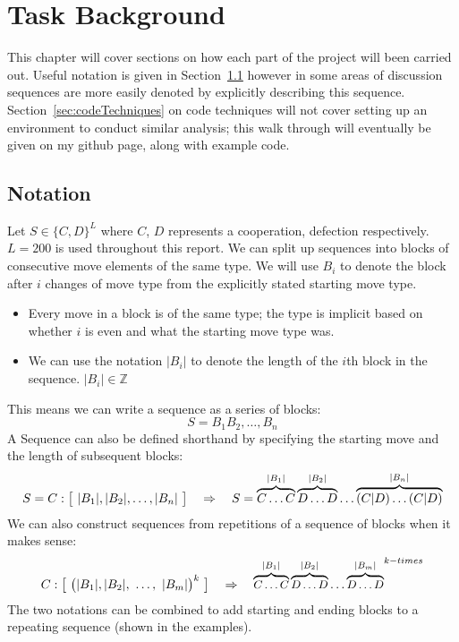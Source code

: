 
\chapter{Task Background}\label{ch:taskBackground}
This chapter will cover sections on how each part of the project will been carried out.
Useful notation is given in Section~\ref{sec:notation} however in some areas of discussion sequences are more easily denoted by explicitly describing this sequence.
Section~\ref{sec:codeTechniques} on code techniques will not cover setting up an environment to conduct similar analysis;
this walk through will eventually be given on my github page, along with example code.

\section{Notation}\label{sec:notation}
Let \(S\in\{C, D\}^L\) where \(C\), \(D\) represents a cooperation, defection respectively. \(L=200\) is used throughout this report.
We can split up sequences into blocks of consecutive move elements of the same type.
We will use \(B_i\) to denote the block after \(i\) changes of move type from the explicitly stated starting move type.
\begin{itemize}
    \item Every move in a block is of the same type;
    the type is implicit based on whether \(i\) is even and what the starting move type was.
    \item We can use the notation \(|B_i|\) to denote the length of the \(i\)th block in the sequence. \(|B_i| \in \mathbb{Z}\)
\end{itemize}

This means we can write a sequence as a series of blocks:
\[S= B_1 B_2,\ldots,B_n\]
A Sequence can also be defined shorthand by specifying the starting move and the length of subsequent blocks:
\[S = C:\big{[}\ |B_1|,|B_2|,\ldots,|B_n|\ \big{]} \quad \Rightarrow \quad S=\overbrace{C\ldots C}^{|B_1|}\overbrace{D\ldots D}^{|B_2|}\ldots\overbrace{(C|D)\ldots (C|D)}^{|B_n|} \]
We can also construct sequences from repetitions of a sequence of blocks when it makes sense:
\[C:\big{[}\ \big{(}|B_1|,|B_2|,\ \ldots,\ |B_m|\big{)}^{k}\ \big{]} \quad \Rightarrow \quad {\small{\overbrace{C\ldots C}^{|B_1|}\overbrace{D\ldots D}^{|B_2|}\ldots\overbrace{D\ldots D}^{|B_m|}}}^{k-times}\]
The two notations can be combined to add starting and ending blocks to a repeating sequence (shown in the examples).\\

